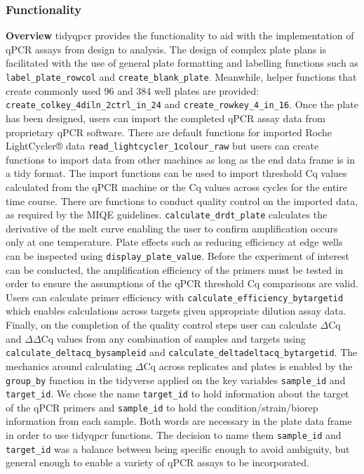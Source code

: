 \documentclass[../main.tex]{subfiles}
\begin{document}
\subsubsection{Functionality}

\textbf{Overview}
tidyqpcr provides the functionality to aid with the implementation of qPCR assays from design to analysis. 
The design of complex plate plans is facilitated with the use of general plate formatting and labelling functions such as \lstinline{label_plate_rowcol} and \lstinline{create_blank_plate}. 
Meanwhile, helper functions that create commonly used 96 and 384 well plates are provided: \lstinline{create_colkey_4diln_2ctrl_in_24} and \lstinline{create_rowkey_4_in_16}. 
Once the plate has been designed, users can import the completed qPCR assay data from proprietary qPCR software. 
There are default functions for imported Roche LightCycler® data \lstinline{read_lightcycler_1colour_raw} but users can create functions to import data from other machines as long as the end data frame is in a tidy format.
The import functions can be used to import threshold Cq values calculated from the qPCR  machine or the Cq values across cycles for the entire time course.
There are functions to conduct quality control on the imported data, as required by the MIQE guidelines. 
\lstinline{calculate_drdt_plate} calculates the derivative of the melt curve enabling the user to confirm amplification occurs only at one temperature.
Plate effects such as reducing efficiency at edge wells can be inspected using \lstinline{display_plate_value}.
Before the experiment of interest can be conducted, the amplification efficiency of the primers must be tested in order to ensure the assumptions of the qPCR threshold Cq comparisons are valid.
Users can calculate primer efficiency with \lstinline{calculate_efficiency_bytargetid} which enables calculations across targets given appropriate dilution assay data.
Finally, on the completion of the quality control steps user can calculate $\Delta$Cq and $\Delta\Delta$Cq values from any combination of samples and targets using \lstinline{calculate_deltacq_bysampleid} and \lstinline{calculate_}\lstinline{deltadeltacq_bytargetid}. 
The mechanics around calculating $\Delta$Cq across replicates and plates is enabled by the \lstinline{group_by} function in the tidyverse applied on the key variables \lstinline{sample_id} and \lstinline{target_id}.
We chose the name \lstinline{target_id} to hold information about the target of the qPCR primers and \lstinline{sample_id} to hold the condition/strain/biorep information from each sample.
Both words are necessary in the plate data frame in order to use tidyqpcr functions. 
The decision to name them \lstinline{sample_id} and \lstinline{target_id} was a balance between being specific enough to avoid ambiguity, but general enough to enable a variety of qPCR assays to be incorporated.  
\end{document}
